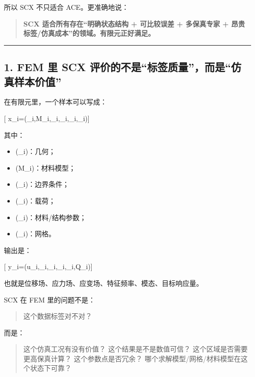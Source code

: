 \documentclass[
  12pt,
]{ctexart}
\providecommand{\tightlist}{%
  \setlength{\itemsep}{0pt}\setlength{\parskip}{0pt}}
\begin{document}
所以 SCX 不只适合 ACE。更准确地说：

\begin{quote}
\textbf{SCX 适合所有存在``明确状态结构 + 可比较误差 + 多保真专家 +
昂贵标签/仿真成本''的领域。有限元正好满足。}
\end{quote}

\begin{center}\rule{0.5\linewidth}{0.5pt}\end{center}

\subsection{1. FEM 里 SCX
评价的不是``标签质量''，而是``仿真样本价值''}\label{fem-ux91cc-scx-ux8bc4ux4ef7ux7684ux4e0dux662fux6807ux7b7eux8d28ux91cfux800cux662fux4effux771fux6837ux672cux4ef7ux503c}

在有限元里，一个样本可以写成：

{[}
x\_i=(\Omega\_i,\mathcal M\_i,\_i,\_i,\theta\_i,\_i){]}

其中：

\begin{itemize}
\tightlist
\item
  (\Omega\_i)：几何；
\item
  (\mathcal M\_i)：材料模型；
\item
  (\_i)：边界条件；
\item
  (\_i)：载荷；
\item
  (\theta\_i)：材料/结构参数；
\item
  (\_i)：网格。
\end{itemize}

输出是：

{[} y\_i=(u\_i,\sigma\_i,\varepsilon\_i,\omega\_i,\phi\_i,Q\_i){]}

也就是位移场、应力场、应变场、特征频率、模态、目标响应量。

SCX 在 FEM 里的问题不是：

\begin{quote}
这个数据标签对不对？
\end{quote}

而是：

\begin{quote}
这个仿真工况有没有价值？ 这个结果是不是数值可信？
这个区域是否需要更高保真计算？ 这个参数点是否冗余？
哪个求解模型/网格/材料模型在这个状态下可靠？
\end{quote}
\end{document}
